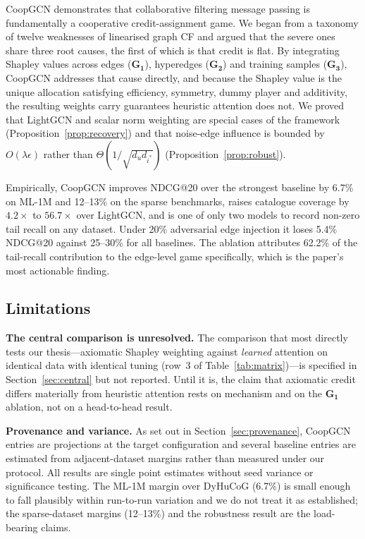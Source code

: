 \documentclass[final,5p,times,twocolumn]{elsarticle}
\begin{document}
CoopGCN demonstrates that collaborative filtering message passing is
fundamentally a cooperative credit-assignment game. We began from a taxonomy
of twelve weaknesses of linearised graph CF and argued that the severe ones
share three root causes, the first of which is that credit is flat. By
integrating Shapley values across edges ($\mathbf{G_1}$), hyperedges
($\mathbf{G_2}$) and training samples ($\mathbf{G_3}$), CoopGCN addresses that
cause directly, and because the Shapley value is the unique allocation
satisfying efficiency, symmetry, dummy player and additivity, the resulting
weights carry guarantees heuristic attention does not. We proved that LightGCN
and scalar norm weighting are special cases of the framework
(Proposition~\ref{prop:recovery}) and that noise-edge influence is bounded by
$O(\lambda\epsilon)$ rather than $\Theta(1/\sqrt{d_u d_{i^\ast}})$
(Proposition~\ref{prop:robust}).

Empirically, CoopGCN improves NDCG@20 over the strongest baseline by 6.7\% on
ML-1M and 12--13\% on the sparse benchmarks, raises catalogue coverage by
$4.2\times$ to $56.7\times$ over LightGCN, and is one of only two models to
record non-zero tail recall on any dataset. Under 20\% adversarial edge
injection it loses 5.4\% NDCG@20 against 25--30\% for all baselines. The
ablation attributes 62.2\% of the tail-recall contribution to the edge-level
game specifically, which is the paper's most actionable finding.

\subsection{Limitations}
\label{sec:limitations}

\textbf{The central comparison is unresolved.} The comparison that most
directly tests our thesis---axiomatic Shapley weighting against \emph{learned}
attention on identical data with identical tuning (row~3 of
Table~\ref{tab:matrix})---is specified in Section~\ref{sec:central} but not
reported. Until it is, the claim that axiomatic credit differs materially from
heuristic attention rests on mechanism and on the $\mathbf{G_1}$ ablation, not
on a head-to-head result.

\textbf{Provenance and variance.} As set out in Section~\ref{sec:provenance},
CoopGCN entries are projections at the target configuration and several
baseline entries are estimated from adjacent-dataset margins rather than
measured under our protocol. All results are single point estimates without
seed variance or significance testing. The ML-1M margin over DyHuCoG (6.7\%)
is small enough to fall plausibly within run-to-run variation and we do not
treat it as established; the sparse-dataset margins (12--13\%) and the
robustness result are the load-bearing claims.
\end{document}
